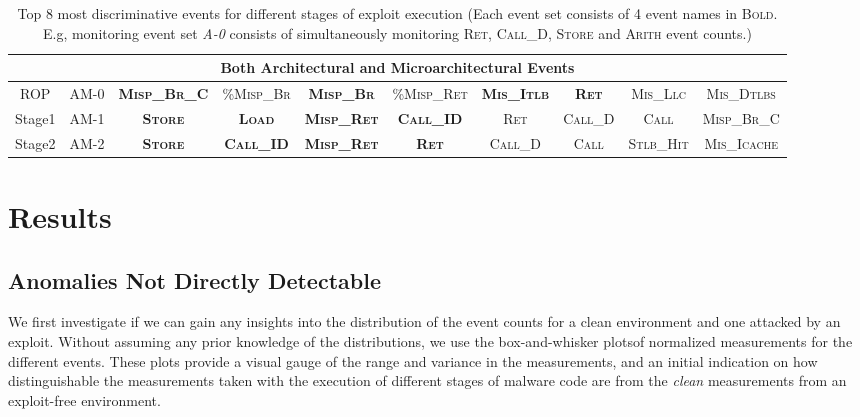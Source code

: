 \documentclass{acm_proc_article-sp}
\begin{document}
\begin{table*}
{\begin{tabular}{|c|c||c|c|c|c|c|c|c|c|}
	\multicolumn{10}{|c|}{Both \textbf{A}rchitectural and \textbf{M}icroarchitectural Events}\\ \hline

	ROP & AM-0 & {\color{RoyalBlue}\textbf{\textsc{Misp\_Br\_C}}} & \textsc{\%Misp\_Br} & {\color{RoyalBlue}\textbf{\textsc{Misp\_Br}}} & \textsc{\%Misp\_Ret} & {\color{RoyalBlue}\textbf{\textsc{Mis\_Itlb}}} & {\color{RoyalBlue}\textbf{\textsc{Ret}}} & \textsc{Mis\_Llc} & \textsc{Mis\_Dtlbs} \\ \hline
	Stage1 & AM-1 & {\color{RoyalBlue}\textbf{\textsc{Store}}} & {\color{RoyalBlue}\textbf{\textsc{Load}}} & {\color{RoyalBlue}\textbf{\textsc{Misp\_Ret}}} & {\color{RoyalBlue}\textbf{\textsc{Call\_ID}}} & \textsc{Ret} & \textsc{Call\_D} & \textsc{Call} & \textsc{Misp\_Br\_C} \\ \hline
	Stage2 & AM-2 & {\color{RoyalBlue}\textbf{\textsc{Store}}} & {\color{RoyalBlue}\textbf{\textsc{Call\_ID}}} & {\color{RoyalBlue}\textbf{\textsc{Misp\_Ret}}} & {\color{RoyalBlue}\textbf{\textsc{Ret}}} & \textsc{Call\_D} & \textsc{Call} & \textsc{Stlb\_Hit} & \textsc{Mis\_Icache} \\ \hline

\end{tabular}}

\caption{Top 8 most discriminative events for different stages of exploit execution (Each event set consists of 4 event names in {\color{RoyalBlue}\textsc{Bold}}. E.g, monitoring event set \textit{A-0} consists of simultaneously monitoring \textsc{Ret}, \textsc{Call\_D}, \textsc{Store} and \textsc{Arith} event counts.)}
\label{tbl:top_ranked_fscores}
\end{table*}




\section{Results}
\label{sec:results}

\subsection{Anomalies Not Directly Detectable}

We first investigate if we can gain any insights into the distribution of the event counts for a clean environment and one attacked by an exploit. Without assuming any prior knowledge of the distributions, we use the box-and-whisker plots\footnotemark[6] of normalized measurements for the different events. These plots provide a visual gauge of the range and variance in the measurements, and an initial indication on how distinguishable the measurements taken with the execution of different stages of malware code are from the \textit{clean} measurements from an exploit-free environment. 
\end{document}
